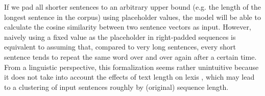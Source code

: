 \documentclass[runningheads]{llncs}
\begin{document}
If we pad all shorter sentences to an arbitrary upper bound (e.g. the length of the longest sentence in the corpus) using placeholder values, the model will be able to calculate the cosine similarity \parencite[3]{luoCosineNormalizationUsing2017} between two sentence vectors as input. However, naively using a fixed value as the placeholder in right-padded sequences \parencite[386]{sachanEffectiveUseBidirectional2018} is equivalent to assuming that, compared to very long sentences, every short sentence tends to repeat the same word over and over again after a certain time. From a linguistic perspective, this formalization seems rather unintuitive because it does not take into account the effects of text length on lexis \parencites[31]{golcherStylometryInterplayTopic2011}[141]{ochabStylometryLiteraryPapyri2019}, which may lead to a clustering of input sentences roughly by (original) sequence length.
\end{document}
